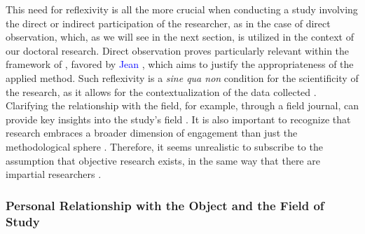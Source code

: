 \begin{refsegment}
This need for reflexivity is all the more crucial when conducting a study involving the direct or indirect participation of the researcher, as in the case of direct observation, which, as we will see in the next section, is utilized in the context of our doctoral research. Direct observation proves particularly relevant within the framework of , favored by \textcolor{blue}{Jean} \textcolor{blue}{\textcite[33]{peneff_mesure_1995}}, which aims to justify the appropriateness of the applied method. Such reflexivity is a \textsl{sine qua non} condition for the scientificity of the research, as it allows for the contextualization of the data collected \textcolor{blue}{\autocite[106]{chevalier_lobservation_2018}}. Clarifying the relationship with the field, for example, through a field journal, can provide key insights into the study's field \textcolor{blue}{\autocite[]{revillard_observation_2018}}. It is also important to recognize that research embraces a broader dimension of engagement than just the methodological sphere \textcolor{blue}{\autocite[70]{opillard_we_2018}}. Therefore, it seems unrealistic to subscribe to the assumption that objective research exists, in the same way that there are impartial researchers \textcolor{blue}{\autocite[]{pincon_grande_2011}}.%

\subsubsection*{Personal Relationship with the Object and the Field of Study
    \label{chap3:application-auto-analyse-sociologique}
    }


\end{refsegment}
